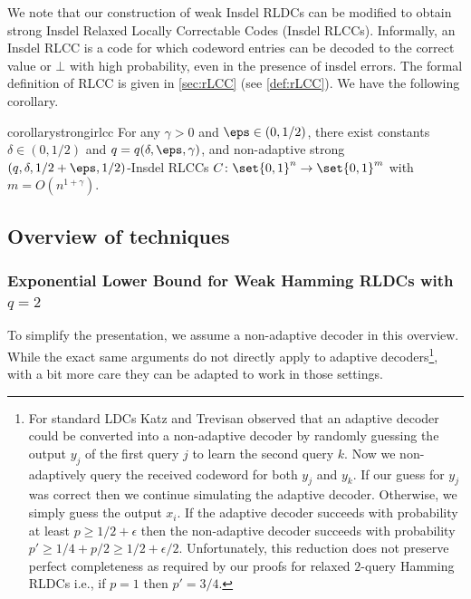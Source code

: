  
 We note that our construction of weak Insdel RLDCs can be modified to obtain strong Insdel Relaxed Locally Correctable Codes (Insdel RLCCs). Informally, an Insdel RLCC is a code for which codeword entries can be decoded to the correct value or $\bot$ with high probability,   even in the presence of insdel errors. 
 The formal definition of RLCC is given in \cref{sec:rLCC} (see \cref{def:rLCC}). We have the following corollary.
 
 \begin{restatable}{corollary}{strongirlcc}\label{thm:main-rilcc-construction}
 For any $\gamma>0$ and $\eps \in (0,1/2)$, there exist constants $\delta \in (0,1/2)$ and $q=q(\delta,\eps,\gamma)$, and non-adaptive strong $(q,\delta,1/2 + \eps, 1/2 )$-Insdel RLCCs $C\colon \set{0,1}^n\rightarrow \set{0,1}^m$ with $m=O(n^{1+\gamma})$. %
 \end{restatable}
 
 


\subsection{Overview of techniques}

\subsubsection{Exponential Lower Bound for Weak Hamming RLDCs with \texorpdfstring{$q=2$}{q=2}}
To simplify the presentation, we assume a non-adaptive decoder in this overview. While the exact same arguments do not directly apply to adaptive decoders\footnote{\label{foot:kt-obs}For standard LDCs Katz and Trevisan \cite{KatzT00} observed that an adaptive decoder could be converted into a non-adaptive decoder by randomly guessing the output $y_j$ of the first query $j$ to learn the second query $k$. Now we non-adaptively query the received codeword for both $y_j$ and $y_k$. If our guess for $y_j$ was correct then we continue simulating the adaptive decoder. Otherwise, we simply guess the output $x_i$. If the adaptive decoder succeeds with probability at least $p \geq 1/2 + \epsilon$ then the non-adaptive decoder succeeds with probability $p' \geq 1/4 + p/2 \geq 1/2 + \epsilon/2$. Unfortunately, this reduction does not preserve perfect completeness as required by our proofs for relaxed $2$-query Hamming RLDCs i.e., if $p=1$ then $p' = 3/4$.}, with a bit more care they can be adapted to work in those settings. 

